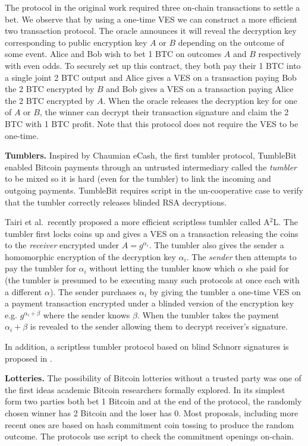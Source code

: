 \documentclass[fullpage]{article}
\theoremstyle{definition}
\begin{document}
The protocol in the original work required three on-chain transactions to settle a bet. We observe that by using a one-time VES we can construct a more efficient two transaction protocol. The oracle announces it will reveal the decryption key corresponding to public encryption key $A$ or $B$ depending on the outcome of some event. Alice and Bob wish to bet 1 BTC on outcomes $A$ and $B$ respectively with even odds. To securely set up this contract, they both pay their 1 BTC into a single joint 2 BTC output and Alice gives a VES on a transaction paying Bob the 2 BTC encrypted by $B$ and Bob gives a VES on a transaction paying Alice the 2 BTC encrypted by $A$. When the oracle releases the decryption key for one of $A$ or $B$, the winner can decrypt their transaction signature and claim the 2 BTC with 1 BTC profit. Note that this protocol does not require the VES to be one-time.

\hfill \break \textbf{Tumblers.}  Inspired by Chaumian eCash\cite{chaum1983blind}, the first tumbler protocol, TumbleBit\cite{tumblebit} enabled Bitcoin payments through an untrusted intermediary called the \emph{tumbler} to be mixed so it is hard (even for the tumbler) to link the incoming and outgoing payments. TumbleBit requires script in the un-cooperative case to verify that the tumbler correctly releases blinded RSA decryptions.

Tairi et al.\ recently proposed a more efficient scriptless tumbler called A$^2$L\cite{cryptoeprint:2019:589}. The tumbler first locks coins up and gives a VES on a transaction releasing the coins to the \emph{receiver} encrypted under $A = g^{\alpha_i}$. The tumbler also gives the sender a homomorphic encryption of the decryption key $\alpha_i$. The \emph{sender} then attempts to pay the tumbler for $\alpha_i$ without letting the tumbler know which $\alpha$ she paid for (the tumbler is presumed to be executing many such protocols at once each with a different $\alpha$). The sender purchases $\alpha_i$ by giving the tumbler a one-time VES on a payment transaction encrypted under a blinded version of the encryption key e.g. $g^{\alpha_i + \beta}$ where the sender knows $\beta$. When the tumbler takes the payment $\alpha_i + \beta$ is revealed to the sender allowing them to decrypt receiver's signature.

In addition, a scriptless tumbler protocol based on blind Schnorr signatures is proposed in \cite{blind-tumbler}.

\hfill \break  \textbf{Lotteries.} The possibility of Bitcoin lotteries without a trusted party\cite{bitcoin_talk} was one of the first ideas academic Bitcoin researchers formally explored\cite{bentov_how_to_use_bitcoin}\cite{andrychowicz_lottery}. In its simplest form two parties both bet 1 Bitcoin and at the end of the protocol, the randomly chosen winner has 2 Bitcoin and the loser has 0. Most proposals, including more recent ones\cite{bartoletti_lottery}\cite{DBLP:journals/corr/MillerB16} are based on hash commitment coin tossing to produce the random outcome. The protocols use script to check the commitment openings on-chain.
\end{document}
